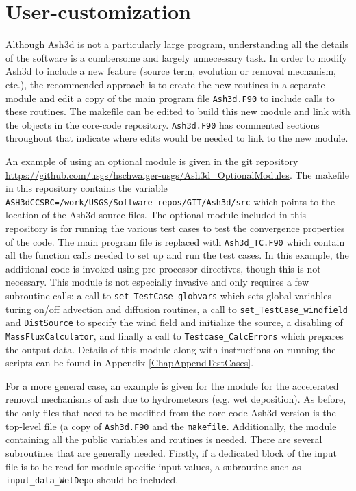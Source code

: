 \section{User-customization}\label{ChapSoftwareStructureUserCust}
Although Ash3d is not a particularly large program, understanding all the
details of the software is a cumbersome and largely unnecessary task.  In
order to modify Ash3d to include a new feature (source term,
evolution or removal mechanism, etc.), the recommended approach is to
create the new routines in a separate module and edit a copy of the main
program file \texttt{Ash3d.F90} to include calls to these routines.  The makefile
can be edited to build this new module and link with the objects in the
core-code repository.  \texttt{Ash3d.F90} has commented sections throughout
that indicate where edits would be needed to link to the new module.

An example
of using an optional module is given in the git repository
\url{https://github.com/usgs/hschwaiger-usgs/Ash3d\_OptionalModules}.
The makefile in this repository contains the variable
\texttt{ASH3dCCSRC=/work/USGS/Software\_repos/GIT/Ash3d/src} which points to the
location of the Ash3d source files.  The optional module included in this repository
is for running the various test cases to test the convergence properties
of the code.  The main program file is replaced with
\texttt{Ash3d\_TC.F90} which contain all the function calls needed to set up and
run the test cases.  In this example, the additional code is invoked using
pre-processor directives, though this is not necessary.
This module is not especially invasive and only requires a few subroutine calls:
a call to \texttt{set\_TestCase\_globvars} which sets global variables turing on/off
advection and diffusion routines, a call to \texttt{set\_TestCase\_windfield} and
\texttt{DistSource} to specify the wind field and initialize the source, a disabling
of \texttt{MassFluxCalculator}, and finally a call to \texttt{Testcase\_CalcErrors}
which prepares the output data.
Details of this module along with instructions on running the scripts can be found
in Appendix \ref{ChapAppendTestCases}.

For a more general case, an example is given for the module for the accelerated
removal mechanisms of ash due to hydrometeors (e.g. wet deposition).  As before,
the only files that need to be modified from the core-code Ash3d version is the
top-level file (a copy of \texttt{Ash3d.F90} and the \texttt{makefile}.  Additionally,
the module containing all the public variables and routines is needed.  There are
several subroutines that are generally needed.  Firstly, if a dedicated block of
the input file is to be read for module-specific input values, a subroutine such
as \texttt{input\_data\_WetDepo} should be included.

